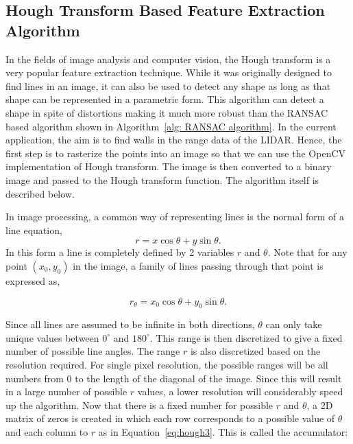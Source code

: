 \subsection{Hough Transform Based Feature Extraction Algorithm}
\label{sec:hough}
In the fields of image analysis and computer vision, the Hough transform is a very popular feature extraction technique\cite{Stockman2001}. While it was originally designed to find lines in an image, it can also be used to detect any shape as long as that shape can be represented in a parametric form\cite{Duda1972}. This algorithm can detect a shape in spite of distortions making it much more robust than the RANSAC based algorithm shown in Algorithm~\ref{alg: RANSAC algorithm}\cite{Hu1998}. In the current application, the aim is to find walls in the range data of the LIDAR. Hence, the first step is to rasterize the points into an image so that we can use the OpenCV implementation of Hough transform. The image is then converted to a binary image and passed to the Hough transform function. The algorithm itself is described below.

In image processing, a common way of representing lines is the normal form of a line equation, 
\begin{equation}
r=x\cos\theta+y\sin\theta.
\label{eq:hough1}
\end{equation}
In this form a line is completely defined by 2 variables $ r $ and  $ \theta $. Note that for any point $ (x_0,y_0) $ in the image, a family of lines passing through that point is expressed as,

\begin{equation}
r_\theta=x_0\cos\theta+y_0\sin\theta.
\label{eq:hough2}
\end{equation}

Since all lines are assumed to be infinite in both directions, $ \theta $ can only take unique values between $ 0^\circ $ and $ 180^\circ $. This range is then discretized to give a fixed number of possible line angles. The range $ r $ is also discretized based on the resolution required. For single pixel resolution, the possible ranges will be all numbers from 0 to the length of the diagonal of the image. Since this will result in a large number of possible $ r $ values, a lower resolution will considerably speed up the algorithm. Now that there is a fixed number for possible $ r $ and $ \theta $, a 2D matrix of zeros is created in which each row corresponds to a possible value of $ \theta $ and each column to $ r $ as in Equation~\ref{eq:hough3}. This is called the accumulator:

